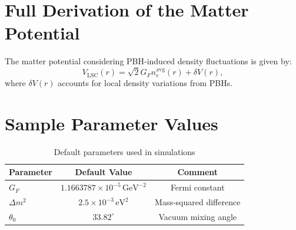 \documentclass[a4paper,11pt]{article}
\begin{document}
\appendix

\section{Full Derivation of the Matter Potential}
The matter potential considering PBH-induced density fluctuations is given by:
\begin{equation}
V_\mathrm{LSC}(r) = \sqrt{2} G_F n_e^{\text{avg}}(r) + \delta V(r),
\end{equation}
where $\delta V(r)$ accounts for local density variations from PBHs.

\section{Sample Parameter Values}
\begin{table}[h]
\centering
\begin{tabular}{lcc}
\hline
Parameter & Default Value & Comment \\
\hline
$G_F$ & $1.1663787 \times 10^{-5}\,\mathrm{GeV}^{-2}$ & Fermi constant \\
$\Delta m^2$ & $2.5 \times 10^{-3}\,\mathrm{eV}^2$ & Mass-squared difference \\
$\theta_0$ & $33.82^\circ$ & Vacuum mixing angle \\
\hline
\end{tabular}
\caption{Default parameters used in simulations}
\end{table}


\printbibliography
\end{document}
